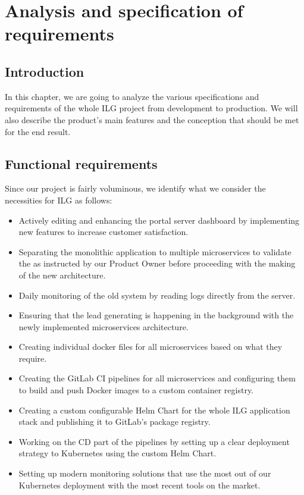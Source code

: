 \chapter{Analysis and specification of requirements}
\minitoc
\newpage

\setcounter{secnumdepth}{0} %
\section{Introduction}
In this chapter, we are going to analyze the various specifications and requirements of the whole ILG project from development to production.
We will also describe the product's main features and the conception that should be met for the end result.

\setcounter{secnumdepth}{2} %
\section{Functional requirements}
Since our project is fairly voluminous, we identify what we consider the necessities for ILG as follows:
\begin{itemize}
	\item Actively editing and enhancing the portal server dashboard by implementing new features to increase customer satisfaction.
	\item Separating the monolithic application to multiple microservices to validate the  as instructed by our Product Owner before proceeding with the making of the new architecture.
	\item Daily monitoring of the old system by reading logs directly from the server.
	\item Ensuring that the lead generating is happening in the background with the newly implemented microservices architecture.
	\item Creating individual docker files for all microservices based on what they require.
	\item Creating the GitLab CI pipelines for all microservices and configuring them to build and push Docker images to a custom container registry.
	\item Creating a custom configurable Helm Chart for the whole ILG application stack and publishing it to GitLab's package registry.
	\item Working on the CD part of the pipelines by setting up a clear deployment strategy to Kubernetes using the custom Helm Chart.
	\item Setting up modern monitoring solutions that use the most out of our Kubernetes deployment with the most recent tools on the market.
\end{itemize}

